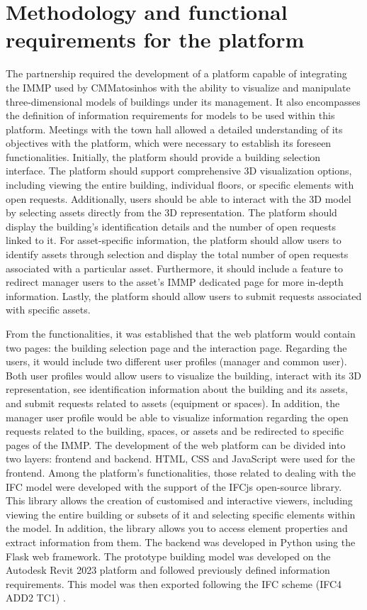 \documentclass[a4paper, 10pt, twocolumn, twoside]{article}
\begin{document}
\section{Methodology and functional requirements for the platform}
\label{sec:methodology}

The partnership required the development of a platform capable of integrating the IMMP used by CMMatosinhos with the ability to visualize and manipulate three-dimensional models of buildings under its management. It also encompasses the definition of information requirements for models to be used within this platform. Meetings with the town hall allowed a detailed understanding of its objectives with the platform, which were necessary to establish its foreseen functionalities. Initially, the platform should provide a building selection interface. The platform should support comprehensive 3D visualization options, including viewing the entire building, individual floors, or specific elements with open requests. Additionally, users should be able to interact with the 3D model by selecting assets directly from the 3D representation. The platform should display the building's identification details and the number of open requests linked to it. For asset-specific information, the platform should allow users to identify assets through selection and display the total number of open requests associated with a particular asset. Furthermore, it should include a feature to redirect manager users to the asset's IMMP dedicated page for more in-depth information. Lastly, the platform should allow users to submit requests associated with specific assets.

From the functionalities, it was established that the web platform would contain two pages: the building selection page and the interaction page. Regarding the users, it would include two different user profiles (manager and common user). Both user profiles would allow users to visualize the building, interact with its 3D representation, see identification information about the building and its assets, and submit requests related to assets (equipment or spaces). In addition, the manager user profile would be able to visualize information regarding the open requests related to the building, spaces, or assets and be redirected to specific pages of the IMMP. The development of the web platform can be divided into two layers: frontend and backend. HTML, CSS and JavaScript were used for the frontend. Among the platform's functionalities, those related to dealing with the IFC model were developed with the support of the IFCjs open-source library. This library allows the creation of customised and interactive viewers, including viewing the entire building or subsets of it and selecting specific elements within the model. In addition, the library allows you to access element properties and extract information from them. The backend was developed in Python using the Flask web framework. The prototype building model was developed on the Autodesk Revit 2023 platform and followed previously defined information requirements. This model was then exported following the IFC scheme (IFC4 ADD2 TC1) \cite{BuildingSMARTa}.
\end{document}
